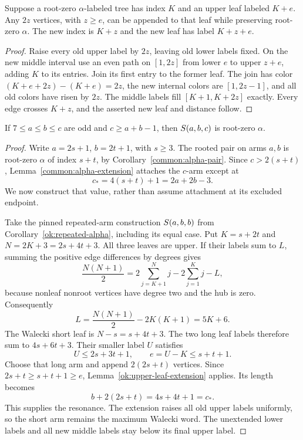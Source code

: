 \begin{lemma}\label{ok:upper-leaf-extension}
Suppose a root-zero $\alpha$-labeled tree has index $K$ and an
upper leaf labeled $K+e$. Any $2z$ vertices, with $z\ge e$, can be
appended to that leaf while preserving root-zero $\alpha$.
The new index is $K+z$ and the new leaf has label $K+z+e$.
\end{lemma}
\begin{proof}
Raise every old upper label by $2z$, leaving old lower labels fixed.
On the new middle interval use an even path on $[1,2z]$
from lower $e$ to upper $z+e$, adding $K$ to its entries.
Join its first entry to the former leaf. The join has color
$(K+e+2z)-(K+e)=2z$, the new internal colors are
$[1,2z-1]$, and all old colors have risen by $2z$.
The middle labels fill $[K+1,K+2z]$ exactly. Every edge crosses
$K+z$, and the asserted new leaf and distance follow.
\end{proof}

\begin{proposition}\label{ok:far-cone}
If $7\le a\le b\le c$ are odd and $c\ge a+b-1$, then
$S\!\left(a,b,c\right)$ is root-zero $\alpha$.
\end{proposition}
\begin{proof}
Write $a=2s+1$, $b=2t+1$, with $s\ge3$.
The rooted pair on arms $a,b$ is root-zero $\alpha$ of index
$s+t$, by Corollary~\ref{common:alpha-pair}.
Since $c>2(s+t)$, Lemma~\ref{common:alpha-extension}
attaches the $c$-arm except at
\[
 c_*=4(s+t)+1=2a+2b-3.
 \]
We now construct that value, rather than assume attachment at its
excluded endpoint.

Take the pinned repeated-arm construction $S\!\left(a,b,b\right)$ from
Corollary~\ref{ok:repeated-alpha}, including its equal case.
Put $K=s+2t$ and $N=2K+3=2s+4t+3$.
All three leaves are upper. If their labels sum to $L$, summing the
positive edge differences by degrees gives
\[
 \frac{N(N+1)}2
   =2\sum_{j=K+1}^N j-2\sum_{j=1}^Kj-L,
 \]
because nonleaf nonroot vertices have degree two and the hub is zero.
Consequently
\begin{equation}
 L=\frac{N(N+1)}2-2K(K+1)=5K+6.
 \label{ok:signed-leaf-sum}
\end{equation}
The Walecki short leaf is $N-s=s+4t+3$.
The two long leaf labels therefore sum to $4s+6t+3$.
Their smaller label $U$ satisfies
\[
 U\le2s+3t+1,\qquad e=U-K\le s+t+1.
 \]
Choose that long arm and append $2(2s+t)$ vertices.
Since $2s+t\ge s+t+1\ge e$, Lemma~\ref{ok:upper-leaf-extension}
applies. Its length becomes
\[
 b+2(2s+t)=4s+4t+1=c_*.
 \]
This supplies the resonance.
The extension raises all old upper labels uniformly, so the short
arm remains the maximum Walecki word. The unextended lower labels
and all new middle labels stay below its final upper label.
\end{proof}


